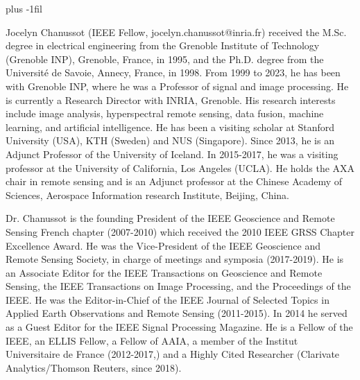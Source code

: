 \documentclass[journal]{IEEEtran}
\begin{document}
\baselineskip plus -1fil

\begin{IEEEbiographynophoto}
    {Jocelyn Chanussot} (IEEE Fellow, jocelyn.chanussot@inria.fr) received the M.Sc. degree in electrical engineering from the Grenoble Institute of Technology (Grenoble INP), Grenoble, France, in 1995, and the Ph.D. degree from the Université de Savoie, Annecy, France, in 1998. From 1999 to 2023, he has been with Grenoble INP, where he was a Professor of signal and image processing. He is currently a Research Director with INRIA, Grenoble. His research interests include image analysis, hyperspectral remote sensing, data fusion, machine learning, and artificial intelligence. He has been a visiting scholar at Stanford University (USA), KTH (Sweden) and NUS (Singapore). Since 2013, he is an Adjunct Professor of the University of Iceland. In 2015-2017, he was a visiting professor at the University of California, Los Angeles (UCLA).  He holds the AXA chair in remote sensing and is an Adjunct professor at the Chinese Academy of Sciences, Aerospace Information research Institute, Beijing, China.

    Dr. Chanussot is the founding President of the IEEE Geoscience and Remote Sensing French chapter (2007-2010) which received the 2010 IEEE GRSS Chapter Excellence Award. He was the Vice-President of the IEEE Geoscience and Remote Sensing Society, in charge of meetings and symposia (2017-2019). He is an Associate Editor for the IEEE Transactions on Geoscience and Remote Sensing, the IEEE Transactions on Image Processing, and the Proceedings of the IEEE. He was the Editor-in-Chief of the IEEE Journal of Selected Topics in Applied Earth Observations and Remote Sensing (2011-2015). In 2014 he served as a Guest Editor for the IEEE Signal Processing Magazine. He is a Fellow of the IEEE, an ELLIS Fellow, a Fellow of AAIA, a member of the Institut Universitaire de France (2012-2017,) and a Highly Cited Researcher (Clarivate Analytics/Thomson Reuters, since 2018).
\end{IEEEbiographynophoto}
\end{document}
